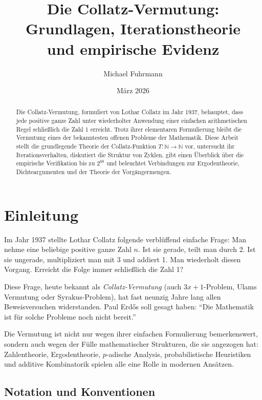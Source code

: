 \documentclass[12pt,a4paper]{article}
\begin{document}
\title{Die Collatz-Vermutung: Grundlagen, Iterationstheorie\\
und empirische Evidenz}
\author{Michael Fuhrmann}
\date{März 2026}
\maketitle

\begin{abstract}
Die Collatz-Vermutung, formuliert von Lothar Collatz im Jahr 1937, behauptet, dass jede
positive ganze Zahl unter wiederholter Anwendung einer einfachen arithmetischen Regel
schließlich die Zahl 1 erreicht. Trotz ihrer elementaren Formulierung bleibt die Vermutung
eines der bekanntesten offenen Probleme der Mathematik. Diese Arbeit stellt die grundlegende
Theorie der Collatz-Funktion $T\colon \mathbb{N} \to \mathbb{N}$ vor, untersucht ihr
Iterationsverhalten, diskutiert die Struktur von Zyklen, gibt einen Überblick über die
empirische Verifikation bis zu $2^{68}$ und beleuchtet Verbindungen zur Ergodentheorie,
Dichteargumenten und der Theorie der Vorgängermengen.
\end{abstract}

\tableofcontents

\newpage

\section{Einleitung}

Im Jahr 1937 stellte Lothar Collatz folgende verblüffend einfache Frage: Man nehme eine
beliebige positive ganze Zahl $n$. Ist sie gerade, teilt man durch 2. Ist sie ungerade,
multipliziert man mit 3 und addiert 1. Man wiederholt diesen Vorgang. Erreicht die
Folge immer schließlich die Zahl 1?

Diese Frage, heute bekannt als \emph{Collatz-Vermutung} (auch $3x+1$-Problem, Ulams
Vermutung oder Syrakus-Problem), hat fast neunzig Jahre lang allen Beweisversuchen
widerstanden. Paul Erd\H{o}s soll gesagt haben: ``Die Mathematik ist für solche Probleme
noch nicht bereit.''

Die Vermutung ist nicht nur wegen ihrer einfachen Formulierung bemerkenswert, sondern
auch wegen der Fülle mathematischer Strukturen, die sie angezogen hat: Zahlentheorie,
Ergodentheorie, $p$-adische Analysis, probabilistische Heuristiken und additive
Kombinatorik spielen alle eine Rolle in modernen Ansätzen.

\subsection{Notation und Konventionen}
\end{document}
